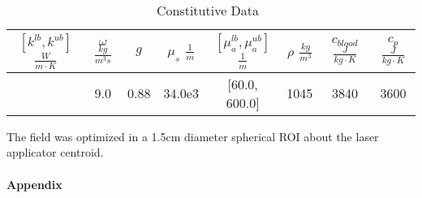 \documentclass{article}
\begin{document}
\begin{table}[h]
\caption{Constitutive Data~\cite{Handbook05,Welch95,duck1990}}\label{modeldata}
\centering 
\begin{tabular}{|c|c|c|c|c|c|c|c|} \hline 
$[k^{lb},k^{ub}]$ $ \frac{W}{ m \cdot K}$ & $\omega$ $\frac{kg}{m^3 s}$ &  $g$  &  $\mu_s$ $\frac{1}{m}$  &  $[\mu_a^{lb},\mu_a^{ub}]$  $\frac{1}{m}$   &  $\rho$ $\frac{kg}{m^3}$ &   $c_{blood}$ $ \frac{J}{kg \cdot K}$ &  $c_p$ $\frac{J}{kg \cdot K}$ \\ \hline
          [0.1, 0.7]                    &             9.0             & 0.88  &       34.0e3              &     [60.0, 600.0]                             &  1045                        &            3840                      &                  3600          \\ \hline
\end{tabular}
\end{table}

The field was optimized in a 1.5cm diameter spherical ROI about
the laser applicator centroid.



\paragraph{\textbf{{\large Appendix}}}
\end{document}
